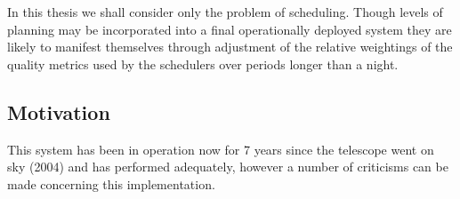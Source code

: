 In this thesis we shall consider only the problem of scheduling. Though levels of planning may be incorporated into a final operationally deployed system they are likely to manifest themselves through adjustment of the relative weightings of the quality metrics used by the schedulers over periods longer than a night. 



\subsection{Motivation}

This system has been in operation now for 7 years since the telescope went on sky (2004) and has performed adequately, however a number of criticisms can be made concerning this implementation.

